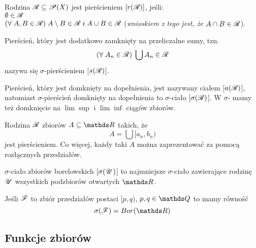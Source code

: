 \begin{multicols}{2}

Rodzina $\mathcal{R}\subseteq\mathcal{P}(X)$ jest {\color{def}pierścieniem} $[r(\mathcal{R})]$, jeśli:\smallskip\\
\point $\emptyset\in\mathcal{R}$\\
\point $(\forall\;A,B\in\mathcal{R})\;A\setminus B\in\mathcal{R}\;i\;A\cup B\in\mathcal{R}$ (\emph{wnioskiem z tego jest, że $A\cap B\in\mathcal{R}$}).
\smallskip

Pierścień, który jest dodatkowo zamknięty na przeliczalne sumy, tzn. 
$$(\forall\;A_n\in\mathcal{R})\;\bigcup A_n\in\mathcal{R}$$ 
nazywa się {\color{def}$\sigma$-pierścieniem} [$s(\mathcal{R})$].
\medskip

Pierścień, który jest domknięty na dopełnienia, jest nazywany {\color{def}ciałem} [$a(\mathcal{R})$], natomiast $\sigma$-pierścień domknięty na dopełnienia to {\color{def}$\sigma$-ciało} [$\sigma(\mathcal{R})$]. W $\sigma$- mamy też domknięcie na {\color{acc}$\lim\sup$ i $\lim\inf$} ciągów zbiorów.
\medskip

Rodzina $\mathcal{R}$ zbiorów $A\subseteq \R$ takich, że
$$A=\bigcup[a_n,b_n)$$
jest pierścieniem. Co więcej, każdy taki $A$ można zaprezentować za pomocą rozłącznych przedziałów.
\bigskip

{\color{def}$\sigma$-ciało zbiorów borelowskich} [$\sigma(\mathcal{U})$] to najmniejsze $\sigma$-ciało zawierające rodzinę $\mathcal{U}$ wszystkich podzbiorów otwartych $\R$.

Jeśli $\mathcal{F}$ to zbiór przedziałów postaci $[p,q)$, $p,q\in\Q$ to mamy równość
$$\sigma(\rodz{F})=Bor(\R)$$

\end{multicols}
\bigskip

\bigskip

\subsection{Funkcje zbiorów}

